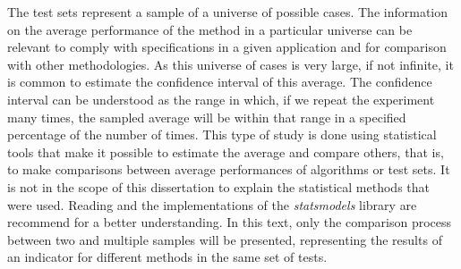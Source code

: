 			The test sets represent a sample of a universe of possible cases. The information on the average performance of the method in a particular universe can be relevant to comply with specifications in a given application and for comparison with other methodologies. As this universe of cases is very large, if not infinite, it is common to estimate the confidence interval of this average. The confidence interval can be understood as the range in which, if we repeat the experiment many times, the sampled average will be within that range in a specified percentage of the number of times. This type of study is done using statistical tools that make it possible to estimate the average and compare others, that is, to make comparisons between average performances of algorithms or test sets. It is not in the scope of this dissertation to explain the statistical methods that were used. Reading \citep{montgomery2010applied} and the implementations of the \textit{statsmodels} library \citep{seabold2010statsmodels} are recommend for a better understanding. In this text, only the comparison process between two and multiple samples will be presented, representing the results of an indicator for different methods in the same set of tests.
			
